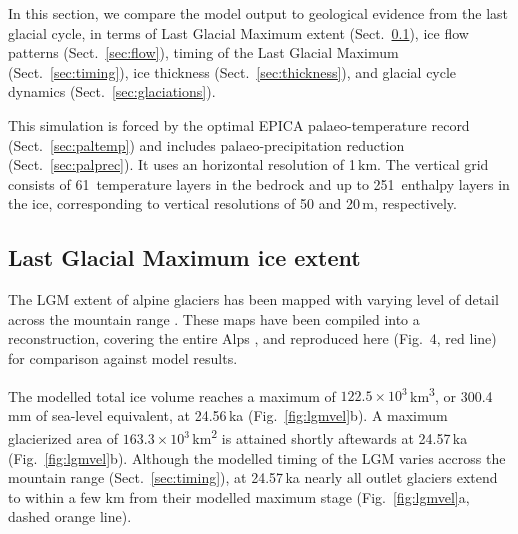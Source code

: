 \documentclass[tc, manuscript]{copernicus}
\begin{document}
    In this section, we compare the model output to geological evidence from
    the last glacial cycle, in terms of Last Glacial Maximum extent
    (Sect.~\ref{sec:extent}), ice flow patterns
    (Sect.~\ref{sec:flow}), timing of the Last Glacial Maximum
    (Sect.~\ref{sec:timing}), ice thickness (Sect.~\ref{sec:thickness}), and
    glacial cycle dynamics (Sect.~\ref{sec:glaciations}).

    This simulation is forced by the optimal EPICA palaeo-temperature record
    (Sect.~\ref{sec:paltemp}) and includes palaeo-precipitation reduction
    (Sect.~\ref{sec:palprec}). It uses an horizontal resolution of 1\,km. The
    vertical grid consists of 61~temperature layers in the bedrock and up to
    251~enthalpy layers in the ice, corresponding to vertical resolutions of 50
    and 20\,\unit{m}, respectively.


\subsection{Last Glacial Maximum ice extent}
\label{sec:extent}

    The LGM extent of alpine glaciers has been mapped with varying level of
    detail across the mountain range \citep{Penck.Bruckner.1909, Jackli.1962,
    Husen.1987, Bini.etal.2009, Coutterand.2010, Bavec.Verbic.2011,
    Buoncristiani.Campy.2011, Husen.2011}. These maps have been compiled
    into a reconstruction, covering the entire Alps \citep{Ehlers.etal.2011},
    and reproduced here (Fig.~4, red line) for comparison against model
    results.

    The modelled total ice volume reaches a maximum of $122.5 \times
    10^{3}$\,\unit{km^3}, or 300.4\,mm of sea-level equivalent, at 24.56\,ka
    (Fig.~\ref{fig:lgmvel}b). A maximum glacierized area of $163.3 \times
    10^{3}$\,\unit{km^2} is attained shortly aftewards at 24.57\,ka
    (Fig.~\ref{fig:lgmvel}b). Although the modelled timing of the LGM varies
    accross the mountain range (Sect.~\ref{sec:timing}), at 24.57\,ka nearly
    all outlet glaciers extend to within a few km from their modelled maximum
    stage (Fig.~\ref{fig:lgmvel}a, dashed orange line).
\end{document}
